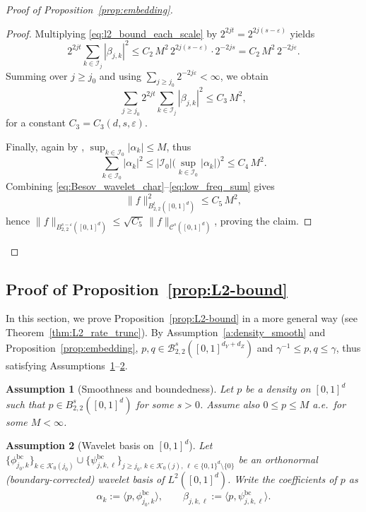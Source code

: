 \documentclass{article}
\theoremstyle{plain}
\newtheorem{assumption}{Assumption}[section]
\theoremstyle{definition}
\def\calC{\mathcal{C}}
\def\calI{\mathcal{I}}
\def\calK{\mathcal{K}}
\theoremstyle{plain}
\def\calC{\mathcal{C}}
\def\calI{\mathcal{I}}
\def\calK{\mathcal{K}}
\begin{document}
\begin{proof}[Proof of Proposition~\ref{prop:embedding}]
\begin{proof}
Multiplying \eqref{eq:l2_bound_each_scale} by $2^{2jt}=2^{2j(s-\varepsilon)}$ yields
\[
2^{2jt}\sum_{k\in\calI_j}|\beta_{j,k}|^2
\le
C_2\,M^2\,2^{2j(s-\varepsilon)}\cdot 2^{-2js}
=
C_2\,M^2\,2^{-2j\varepsilon}.
\]
Summing over $j\ge j_0$ and using $\sum_{j\ge j_0}2^{-2j\varepsilon}<\infty$, we obtain
\begin{equation}\label{eq:high_freq_sum}
\sum_{j\ge j_0} 2^{2jt}\sum_{k\in\calI_j}|\beta_{j,k}|^2
\le
C_3\,M^2,
\end{equation}
for a constant $C_3=C_3(d,s,\varepsilon)$.

Finally, again by \cite[Lemma 2]{manole2024plugin}, $\sup_{k\in\calI_0}|\alpha_k| \leq M$, thus
\begin{equation}\label{eq:low_freq_sum}
\sum_{k\in\calI_0}|\alpha_k|^2
\le
|\calI_0|\Big(\sup_{k\in\calI_0}|\alpha_k|\Big)^2
\le
C_4\,M^2.
\end{equation}
Combining \eqref{eq:Besov_wavelet_char}--\eqref{eq:low_freq_sum} gives
\[
\|f\|_{B^{t}_{2,2}([0,1]^d)}^2
\le
C_5\,M^2,
\]
hence $\|f\|_{B^{s-\varepsilon}_{2,2}([0,1]^d)} \le \sqrt{C_5}\,\|f\|_{\calC^{s}([0,1]^d)}$, proving the claim.
\end{proof}

\end{proof}


 

\subsection{Proof of Proposition~\ref{prop:L2-bound}}
In this section, we prove Proposition~\ref{prop:L2-bound} in a more general way (see Theorem~\ref{thm:L2_rate_trunc}). By Assumption~\ref{a:density_smooth} and Proposition~\ref{prop:embedding}, $p, q \in  \mathcal{B}^s_{2,2}([0,1]^{d_Y+d_Z})$ and $\gamma^{-1}\leq p,q \leq \gamma$, thus satisfying Assumptions~\ref{ass:p_smooth}--\ref{ass:wavelet}.
\begin{assumption}[Smoothness and boundedness]\label{ass:p_smooth}
Let $p$ be a density on $[0,1]^d$ such that $p \in B^{s}_{2,2}([0,1]^d)$ for some $s>0$.
Assume also $0 \le p \le M$ a.e.\ for some $M<\infty$.
\end{assumption}

\begin{assumption}[{Wavelet basis on $[0,1]^d$}]\label{ass:wavelet}
Let $\{\phi_{j_0,k}^{\mathrm{bc}}\}_{k\in\calK_0(j_0)} \cup \{\psi^{\mathrm{bc}}_{j,k,\ell}\}_{j\ge j_0,\,k\in\calK_0(j),\,\ell\in\{0,1\}^d\setminus\{0\}}$
be an orthonormal (boundary-corrected) wavelet basis of $L^2([0,1]^d)$.
Write the coefficients of $p$ as
\[
\alpha_{k} := \langle p, \phi_{j_0,k}^{\mathrm{bc}}\rangle,
\qquad
\beta_{j,k,\ell} := \langle p, \psi^{\mathrm{bc}}_{j,k,\ell}\rangle.
\]
\end{assumption}
\end{document}
